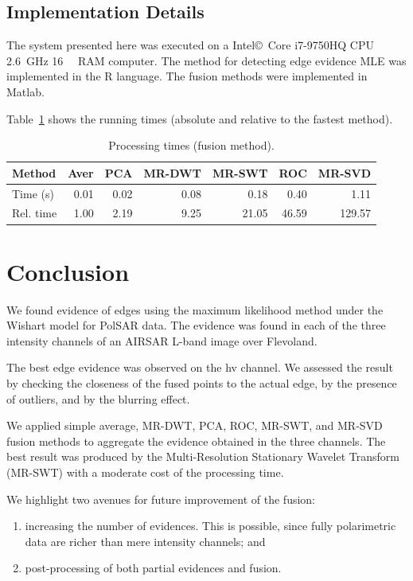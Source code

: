 \documentclass[journal]{IEEEtran}
\begin{document}
\subsection{Implementation Details}

The system presented here was executed on a Intel\copyright\ Core i7-9750HQ CPU \SI{2.6}{\giga\hertz} \SI{16}{\giga\byte} RAM computer.  
The method for detecting edge evidence MLE was implemented in the R language.
The fusion methods were implemented in Matlab. 

Table~\ref{metrica_de_tempo} shows the running times (absolute and relative to the fastest method).

\begin{table}[hbt]
	\centering
	\caption{Processing times (fusion method).}\label{metrica_de_tempo}
	\begin{tabular}{@{}lrrrrrr@{}} \toprule
		Method       & Aver   &   PCA      &  MR-DWT  & MR-SWT &  ROC  &  MR-SVD \\ \midrule
		Time (s)      & 0.01      & 0.02       &  0.08 & 0.18      &  0.40       & 1.11  \\
		Rel. time     & 1.00      & 2.19       &  9.25 & 21.05     &  46.59      & 129.57  \\ \bottomrule
	\end{tabular}
\end{table}

\section{Conclusion}\label{sec_06}

We found evidence of edges using the maximum likelihood method under the Wishart model for PolSAR data. 
The evidence was found in each of the three intensity channels of an AIRSAR L-band image over Flevoland.

The best edge evidence was observed on the hv channel. We assessed the result by checking the closeness of the fused points to the actual edge, by the presence of outliers, and by the blurring effect.

We applied simple average, MR-DWT, PCA, ROC, MR-SWT, and MR-SVD fusion methods to aggregate the evidence obtained in the three channels.
The best result was produced by the Multi-Resolution Stationary Wavelet Transform (MR-SWT) with a moderate cost of the processing time.

We highlight two avenues for future improvement of the fusion:
\begin{enumerate}
	\item increasing the number of evidences.
	This is possible, since fully polarimetric data are richer than mere intensity channels; and
	\item post-processing of both partial evidences and fusion.
\end{enumerate}



\end{document}
